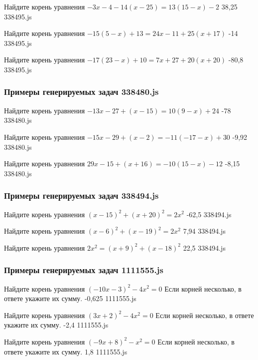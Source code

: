 \par{Найдите корень уравнения $−3x−4−14(x−25)=13(15−x)−2$ }{ 38,25 }{338495.js}
\par{Найдите корень уравнения $−15(5−x)+13=24x−11+25(x+17)$ }{ -14 }{338495.js}
\par{Найдите корень уравнения $−17(23−x)+10=7x+27+20(x+20)$ }{ -80,8 }{338495.js}


\subsubsection*{Примеры генерируемых задач 338480.js}   

\par{Найдите корень уравнения $−13x−27+(x−15)=10(9−x)+24$ }{ -78 }{338480.js}
\par{Найдите корень уравнения $−15x−29+(x−2)=−11(−17−x)+30$ }{ -9,92 }{338480.js}
\par{Найдите корень уравнения $29x−15+(x+16)=−10(15−x)−12$ }{ -8,15 }{338480.js}


\subsubsection*{Примеры генерируемых задач 338494.js}   

\par{Найдите корень уравнения $(x−15)^2+(x+20)^2=2x^2$ }{ -62,5 }{338494.js}
\par{Найдите корень уравнения $(x−6)^2+(x−19)^2=2x^2$ }{ 7,94 }{338494.js}
\par{Найдите корень уравнения $2x^2=(x+9)^2+(x−18)^2$ }{ 22,5 }{338494.js}


\subsubsection*{Примеры генерируемых задач 1111555.js}   

\par{Найдите корень уравнения $(−10x−3)^2−4x^2=0$ Если корней несколько, в ответе укажите их сумму. }{ -0,625 }{1111555.js}
\par{Найдите корень уравнения $(3x+2)^2−4x^2=0$ Если корней несколько, в ответе укажите их сумму. }{ -2,4 }{1111555.js}
\par{Найдите корень уравнения $(−9x+8)^2−x^2=0$ Если корней несколько, в ответе укажите их сумму. }{ 1,8 }{1111555.js}

